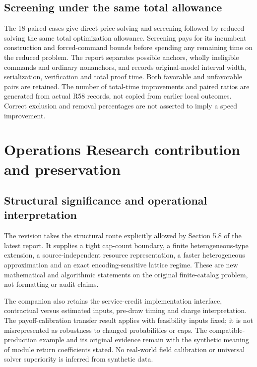 \subsection{Screening under the same total allowance}
The 18 paired cases give direct price solving and screening followed by reduced solving the same total optimization allowance. Screening pays for its incumbent construction and forced-command bounds before spending any remaining time on the reduced problem. The report separates possible anchors, wholly ineligible commands and ordinary nonanchors, and records original-model interval width, serialization, verification and total proof time. Both favorable and unfavorable pairs are retained. The number of total-time improvements and paired ratios are generated from actual R58 records, not copied from earlier local outcomes. Correct exclusion and removal percentages are not asserted to imply a speed improvement.

\section{Operations Research contribution and preservation}
\subsection{Structural significance and operational interpretation}
The revision takes the structural route explicitly allowed by Section 5.8 of the latest report. It supplies a tight cap-count boundary, a finite heterogeneous-type extension, a source-independent resource representation, a faster heterogeneous approximation and an exact encoding-sensitive lattice regime. These are new mathematical and algorithmic statements on the original finite-catalog problem, not formatting or audit claims.

The companion also retains the service-credit implementation interface, contractual versus estimated inputs, pre-draw timing and charge interpretation. The payoff-calibration transfer result applies with feasibility inputs fixed; it is not misrepresented as robustness to changed probabilities or caps. The compatible-production example and its original evidence remain with the synthetic meaning of module return coefficients stated. No real-world field calibration or universal solver superiority is inferred from synthetic data.

